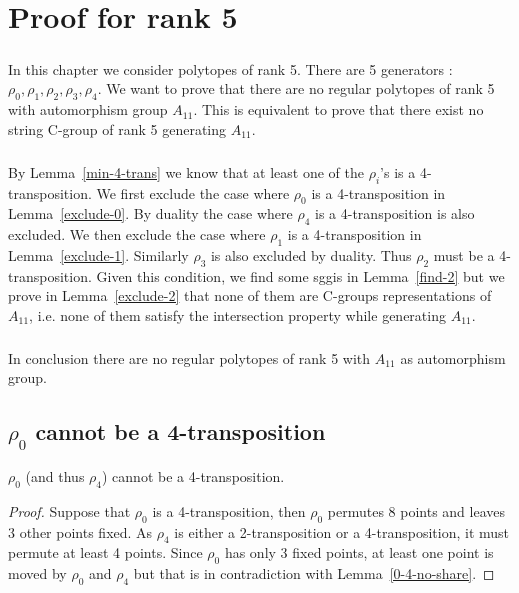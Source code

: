 \chapter{Proof for rank 5}
\label{proof-5}

\paragraph{}
In this chapter we consider polytopes of rank 5. There are 5 generators : $\rho_0, \rho_1, \rho_2, \rho_3, \rho_4$. We want to prove that there are no regular polytopes of rank 5 with automorphism group $A_{11}$. This is equivalent to prove that there exist no string C-group of rank 5 generating $A_{11}$.

\paragraph{}
By Lemma~\ref{min-4-trans} we know that at least one of the $\rho_i$'s is a 4-transposition. We first exclude the case where $\rho_0$ is a 4-transposition in Lemma~\ref{exclude-0}. By duality the case where $\rho_4$ is a 4-transposition is also excluded. We then exclude the case where $\rho_1$ is a 4-transposition in Lemma~\ref{exclude-1}. Similarly $\rho_3$ is also excluded by duality. Thus $\rho_2$ must be a 4-transposition. Given this condition, we find some sggis in Lemma~\ref{find-2} but we prove in Lemma~\ref{exclude-2} that none of them are C-groups representations of $A_{11}$, i.e. none of them satisfy the intersection property while generating $A_{11}$.

\paragraph{}
In conclusion there are no regular polytopes of rank 5 with $A_{11}$ as automorphism group.

\section{$\rho_0$ cannot be a 4-transposition}

\begin{lemma}
  \label{exclude-0}
  $\rho_0$ (and thus $\rho_4$) cannot be a 4-transposition.
\end{lemma}

\begin{proof}
  Suppose that $\rho_0$ is a 4-transposition, then $\rho_0$ permutes 8 points and leaves 3 other points fixed. As $\rho_4$ is either a 2-transposition or a 4-transposition, it must permute at least 4 points. Since $\rho_0$ has only 3 fixed points, at least one point is moved by $\rho_0$ and $\rho_4$ but that is in contradiction with Lemma~\ref{0-4-no-share}.
\end{proof}
